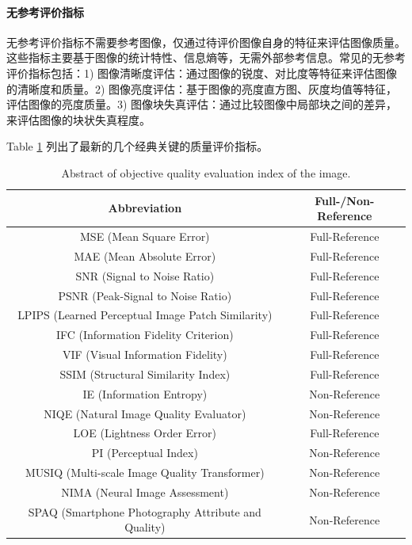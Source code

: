 \documentclass[letterpaper,12pt]{article}
\begin{document}
			\paragraph{无参考评价指标}
			
			无参考评价指标不需要参考图像，仅通过待评价图像自身的特征来评估图像质量。这些指标主要基于图像的统计特性、信息熵等，无需外部参考信息。常见的无参考评价指标包括：1) 图像清晰度评估：通过图像的锐度、对比度等特征来评估图像的清晰度和质量。2) 图像亮度评估：基于图像的亮度直方图、灰度均值等特征，评估图像的亮度质量。3) 图像块失真评估：通过比较图像中局部块之间的差异，来评估图像的块状失真程度。
			
			Table \ref{tab: quality evaluation index} 列出了最新的几个经典关键的质量评价指标。
		
		
			\begin{table}[!htbp]
				\centering
				\tiny
					\begin{tabular}{cc}
						
						\toprule
						
						\textbf{Abbreviation} & \textbf{Full-/Non-Reference} \\
						
						\hline
						
						MSE (Mean Square Error) & Full-Reference \\
						MAE (Mean Absolute Error) & Full-Reference \\
						SNR (Signal to Noise Ratio) & Full-Reference \\
						PSNR (Peak-Signal to Noise Ratio) & Full-Reference \\
						LPIPS (Learned Perceptual Image Patch Similarity) & Full-Reference \\
						IFC (Information Fidelity Criterion) & Full-Reference \\
						VIF (Visual Information Fidelity) & Full-Reference \\
						SSIM (Structural Similarity Index) & Full-Reference \\
						IE (Information Entropy) & Non-Reference \\
						NIQE (Natural Image Quality Evaluator) & Non-Reference \\
						LOE (Lightness Order Error) & Full-Reference \\
						PI (Perceptual Index) & Non-Reference \\
						MUSIQ (Multi-scale Image Quality Transformer) & Non-Reference \\
						NIMA (Neural Image Assessment) & Non-Reference \\
						SPAQ (Smartphone Photography Attribute and Quality) & Non-Reference \\
						
						\bottomrule
						
					\end{tabular}
				\captionsetup{font=scriptsize} %
				\caption{\label{tab: quality evaluation index}
					Abstract of objective quality evaluation index of the image.} %
				
			\end{table}
		
\end{document}

